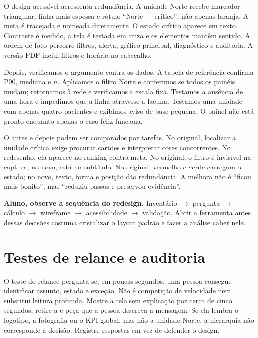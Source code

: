 O design acessível acrescenta redundância. A unidade Norte recebe marcador triangular, linha mais espessa e rótulo ``Norte --- crítico'', não apenas laranja. A meta é tracejada e nomeada diretamente. O estado crítico aparece em texto. Contraste é medido, a tela é testada em cinza e os elementos mantêm sentido. A ordem de foco percorre filtros, alerta, gráfico principal, diagnóstico e auditoria. A versão PDF inclui filtros e horário no cabeçalho.

Depois, verificamos o argumento contra os dados. A tabela de referência confirma P90, mediana e $n$. Aplicamos o filtro Norte e conferimos se todos os painéis mudam; retornamos à rede e verificamos a escala fixa. Testamos a ausência de uma hora e impedimos que a linha atravesse a lacuna. Testamos uma unidade com apenas quatro pacientes e exibimos aviso de base pequena. O painel não está pronto enquanto apenas o caso feliz funciona.

O antes e depois podem ser comparados por tarefas. No original, localizar a unidade crítica exige procurar cartões e interpretar cores concorrentes. No redesenho, ela aparece no ranking contra meta. No original, o filtro é invisível na captura; no novo, está no subtítulo. No original, vermelho e verde carregam o estado; no novo, texto, forma e posição dão redundância. A melhora não é ``ficou mais bonito'', mas ``reduziu passos e preservou evidência''.

\begin{GuidedBox}
\textbf{Aluno, observe a sequência do redesign.} Inventário $\rightarrow$ pergunta $\rightarrow$ cálculo $\rightarrow$ wireframe $\rightarrow$ acessibilidade $\rightarrow$ validação. Abrir a ferramenta antes dessas decisões costuma cristalizar o layout padrão e fazer a análise caber nele.
\end{GuidedBox}

\section{Testes de relance e auditoria}

O teste do relance pergunta se, em poucos segundos, uma pessoa consegue identificar assunto, estado e exceção. Não é competição de velocidade nem substitui leitura profunda. Mostre a tela sem explicação por cerca de cinco segundos, retire-a e peça que a pessoa descreva a mensagem. Se ela lembra o logotipo, a fotografia ou o KPI global, mas não a unidade Norte, a hierarquia não corresponde à decisão. Registre respostas em vez de defender o design.

